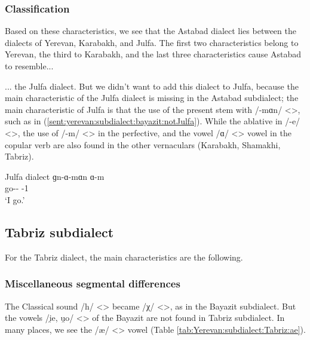 \subsubsection{Classification}

Based on these characteristics, we see that the Astabad dialect lies between the dialects of Yerevan, Karabakh, and Julfa. The first two characteristics belong to Yerevan, the third to Karabakh, and the last three characteristics cause Astabad to resemble... 
\begin{adjarianpage}\label{page:46}\end{adjarianpage}%

... the Julfa dialect. But we didn't want to add this dialect to Julfa, because the main characteristic of the Julfa dialect is missing in the Astabad subdialect; the main characteristic of Julfa is that the use of the present stem with /-mɑn/ <>, such as in (\ref{sent:yerevan:subdialect:bayazit:notJulfa}). While the ablative in /-e/ <>, the use of /-m/ <> in the perfective, and the vowel /ɑ/ <> vowel in the copular verb are also found in the other vernaculars (Karabakh, Shamakhi, Tabriz). 


\begin{exe}
	\ex Julfa dialect \gll
	ɡn-ɑ-mɑn ɑ-m \\
	go-{\thgloss}-{\impfcvb} {\aux}-1{\sg} \\
	\trans `I go.'\label{sent:yerevan:subdialect:bayazit:notJulfa} \\
	
\end{exe}


\subsection{Tabriz subdialect}


For the Tabriz dialect, the main characteristics are the following. 


\subsubsection{Miscellaneous segmental differences} 

The Classical sound /h/ <> became /χ/ <>, as in the Bayazit subdialect. But the vowels /i̯e, u̯o/ <> of the Bayazit are not found in Tabriz subdialect. In many places, we see the /æ/ <> vowel (Table \ref{tab:Yerevan:subdialect:Tabriz:ae}). 





